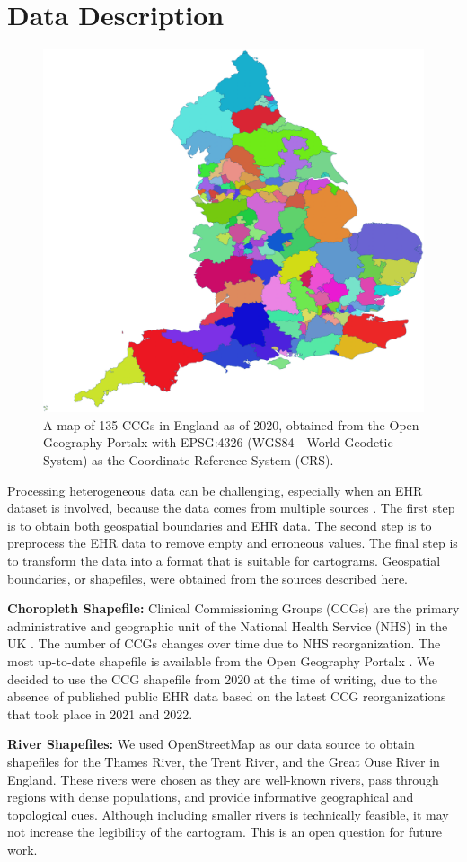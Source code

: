 \documentclass[Afour,sagev,times]{sagej}
\newcommand{\bobgraph}[1]{\noindent\textbf{#1}}
\begin{document}
\section{Data Description}

 {
  \begin{figure}[b!]
      \centering
      \includegraphics[width=0.6\columnwidth]{ccg.png}
      \caption{A map of 135 CCGs in England as of 2020, obtained from the Open Geography Portalx \cite{opengeographyportalxOpen} with EPSG:4326 (WGS84 - World Geodetic System) as the Coordinate Reference System (CRS).}
      \label{fig:ccg}
  \end{figure}
 }

Processing heterogeneous data can be challenging, especially when an EHR dataset is involved, because the data comes from multiple sources \cite{wang2021EHR}. The first step is to obtain both geospatial boundaries and EHR data. The second step is to preprocess the EHR data to remove empty and erroneous values. The final step is to transform the data into a format that is suitable for cartograms. Geospatial boundaries, or shapefiles, were obtained from the sources described here.

\bobgraph{Choropleth Shapefile:} Clinical Commissioning Groups (CCGs) are the primary administrative and geographic unit of the National Health Service (NHS) in the UK \cite{nhsNHS}. The number of CCGs changes over time due to NHS reorganization. The most up-to-date shapefile is available from the Open Geography Portalx \cite{opengeographyportalxOpen}. We decided to use the CCG shapefile from 2020 at the time of writing, due to the absence of published public EHR data based on the latest CCG reorganizations that took place in 2021 and 2022.

\bobgraph{River Shapefiles:} We used OpenStreetMap \cite{openstreetmapRelation} as our data source to obtain shapefiles for the Thames River, the Trent River, and the Great Ouse River in England. These rivers were chosen as they are well-known rivers, pass through regions with dense populations, and provide informative geographical and topological cues. Although including smaller rivers is technically feasible, it may not increase the legibility of the cartogram. This is an open question for future work.
\end{document}
